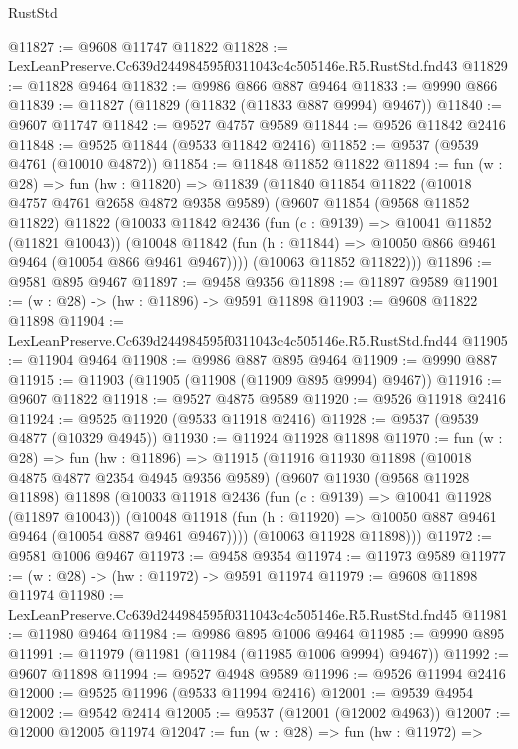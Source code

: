 \begin{lexlean}{RustStd}
\begin{coremodule}
@11827 := @9608 @11747 @11822
@11828 := LexLeanPreserve.Cc639d244984595f0311043c4c505146e.R5.RustStd.fnd43
@11829 := @11828 @9464
@11832 := @9986 @866 @887 @9464
@11833 := @9990 @866
@11839 := @11827 (@11829 (@11832 (@11833 @887 @9994) @9467))
@11840 := @9607 @11747
@11842 := @9527 @4757 @9589
@11844 := @9526 @11842 @2416
@11848 := @9525 @11844 (@9533 @11842 @2416)
@11852 := @9537 (@9539 @4761 (@10010 @4872))
@11854 := @11848 @11852 @11822
@11894 := fun (w : @28) =>
  fun (hw : @11820) =>
  @11839
    (@11840
      @11854
      @11822
      (@10018 @4757 @4761 @2658 @4872 @9358 @9589)
      (@9607
        @11854
        (@9568 @11852 @11822)
        @11822
        (@10033
          @11842
          @2436
          (fun (c : @9139) => @10041 @11852 (@11821 @10043))
          (@10048 @11842 (fun (h : @11844) => @10050 @866 @9461 @9464 (@10054 @866 @9461 @9467))))
        (@10063 @11852 @11822)))
@11896 := @9581 @895 @9467
@11897 := @9458 @9356
@11898 := @11897 @9589
@11901 := (w : @28) -> (hw : @11896) -> @9591 @11898
@11903 := @9608 @11822 @11898
@11904 := LexLeanPreserve.Cc639d244984595f0311043c4c505146e.R5.RustStd.fnd44
@11905 := @11904 @9464
@11908 := @9986 @887 @895 @9464
@11909 := @9990 @887
@11915 := @11903 (@11905 (@11908 (@11909 @895 @9994) @9467))
@11916 := @9607 @11822
@11918 := @9527 @4875 @9589
@11920 := @9526 @11918 @2416
@11924 := @9525 @11920 (@9533 @11918 @2416)
@11928 := @9537 (@9539 @4877 (@10329 @4945))
@11930 := @11924 @11928 @11898
@11970 := fun (w : @28) =>
  fun (hw : @11896) =>
  @11915
    (@11916
      @11930
      @11898
      (@10018 @4875 @4877 @2354 @4945 @9356 @9589)
      (@9607
        @11930
        (@9568 @11928 @11898)
        @11898
        (@10033
          @11918
          @2436
          (fun (c : @9139) => @10041 @11928 (@11897 @10043))
          (@10048 @11918 (fun (h : @11920) => @10050 @887 @9461 @9464 (@10054 @887 @9461 @9467))))
        (@10063 @11928 @11898)))
@11972 := @9581 @1006 @9467
@11973 := @9458 @9354
@11974 := @11973 @9589
@11977 := (w : @28) -> (hw : @11972) -> @9591 @11974
@11979 := @9608 @11898 @11974
@11980 := LexLeanPreserve.Cc639d244984595f0311043c4c505146e.R5.RustStd.fnd45
@11981 := @11980 @9464
@11984 := @9986 @895 @1006 @9464
@11985 := @9990 @895
@11991 := @11979 (@11981 (@11984 (@11985 @1006 @9994) @9467))
@11992 := @9607 @11898
@11994 := @9527 @4948 @9589
@11996 := @9526 @11994 @2416
@12000 := @9525 @11996 (@9533 @11994 @2416)
@12001 := @9539 @4954
@12002 := @9542 @2414
@12005 := @9537 (@12001 (@12002 @4963))
@12007 := @12000 @12005 @11974
@12047 := fun (w : @28) =>
  fun (hw : @11972) =>

\end{coremodule}
\end{lexlean}
